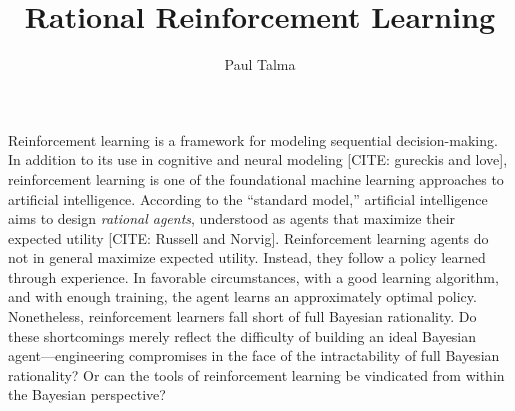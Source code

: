 \documentclass{phil-paper}
\title{Rational Reinforcement Learning}
\author{Paul Talma}
\begin{document}
Reinforcement learning is a framework for modeling sequential decision-making.
In addition to its use in cognitive and neural modeling [CITE: gureckis and love], reinforcement learning is one of the foundational machine learning approaches to artificial intelligence.
According to the ``standard model,'' artificial intelligence aims to design \emph{rational agents}, understood as agents that maximize their expected utility [CITE: Russell and Norvig].
Reinforcement learning agents do not in general maximize expected utility.
Instead, they follow a policy learned through experience.
In favorable circumstances, with a good learning algorithm, and with enough training, the agent learns an approximately optimal policy.
Nonetheless, reinforcement learners fall short of full Bayesian rationality.
Do these shortcomings merely reflect the difficulty of building an ideal Bayesian agent---engineering compromises in the face of the intractability of full Bayesian rationality?
Or can the tools of reinforcement learning be vindicated from within the Bayesian perspective?


% 

% 

% 



	
\end{document}
